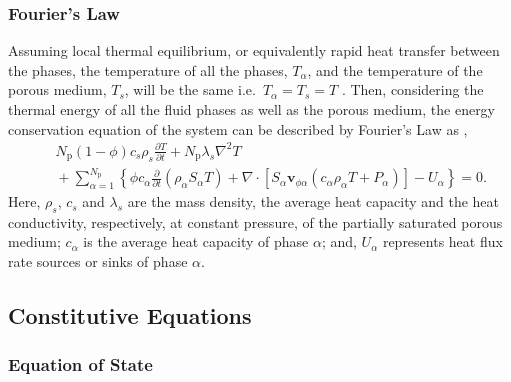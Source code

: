 \subsubsection{Fourier's Law}

Assuming local thermal equilibrium, or equivalently rapid heat transfer between the phases, the temperature of all the phases, $T_\alpha$, and the temperature of the porous medium, $T_s$, will be the same i.e.\ $T_\alpha = T_{s} = T$ \cite{hassanizadeh_1993}.  Then, considering the thermal energy of all the fluid phases as well as the porous medium, the energy conservation equation of the system can be described by Fourier's Law as \cite{helmig_1997},
\begin{eqnarray}
& {} & N_\mathrm{p} (1-\phi) c_s \rho_s \frac{\partial T}{\partial t} + N_\mathrm{p} \lambda_s \nabla^2 T \nonumber \\
& {} & {} + \sum_{\alpha = 1}^{N_\mathrm{p}} \left\{ \phi c_\alpha \frac{\partial}{\partial t}(\rho_\alpha S_\alpha T) +  \nabla \cdot \left[ S_\alpha \mathbf{v}_{\phi \alpha} \left(c_\alpha \rho_\alpha T + P_\alpha \right) \right] - U_\alpha \right\} = 0.\label{e:energy}
\end{eqnarray}
Here, $\rho_s$, $c_s$ and $\lambda_s$ are the mass density, the average heat capacity and the heat conductivity, respectively, at constant pressure, of the partially saturated porous medium; $c_\alpha$ is the average heat capacity of phase $\alpha$; and, $U_\alpha$ represents heat flux rate sources or sinks of phase $\alpha$.

\subsection{Constitutive Equations}

\subsubsection{Equation of State}

